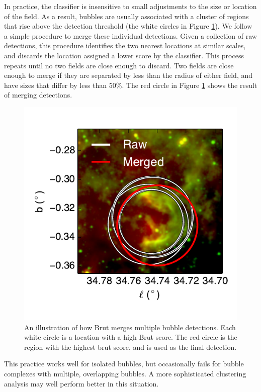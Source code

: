 In practice, the classifier is insensitive to small adjustments to the size or location of the field. As a result, bubbles are usually associated with a cluster of regions that rise above the detection threshold (the white circles in Figure \ref{fig:cluster}). We follow a simple procedure to merge these individual detections. Given a collection of raw detections, this procedure identifies the two nearest locations at similar scales, and discards the location assigned a lower score by the classifier. This process repeats until no two fields are close enough to discard. Two fields are close enough to merge if they are separated by less than the radius of either field, and have sizes that differ by less than 50\%. The red circle in Figure \ref{fig:cluster} shows the result of merging detections.

\begin{figure}[h!]
\includegraphics{cluster}
\caption{An illustration of how Brut merges multiple bubble detections. Each white circle is a location with a high Brut score. The red circle is the region with the highest brut score, and is used as the final detection.}
\label{fig:cluster}
\end{figure}

This practice works well for isolated bubbles, but occasionally fails for bubble complexes with multiple, overlapping bubbles. A more sophisticated clustering analysis may well perform better in this situation.

